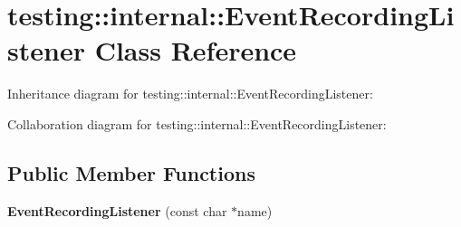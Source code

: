 \hypertarget{classtesting_1_1internal_1_1EventRecordingListener}{}\section{testing\+:\+:internal\+:\+:Event\+Recording\+Listener Class Reference}
\label{classtesting_1_1internal_1_1EventRecordingListener}


Inheritance diagram for testing\+:\+:internal\+:\+:Event\+Recording\+Listener\+:


Collaboration diagram for testing\+:\+:internal\+:\+:Event\+Recording\+Listener\+:
\subsection*{Public Member Functions}
\begin{DoxyCompactItemize}
\item 
\mbox{\label{classtesting_1_1internal_1_1EventRecordingListener_a7b0254c15d6b8468e1441ee572fee707}} 
{\bfseries Event\+Recording\+Listener} (const char $\ast$name)
\end{DoxyCompactItemize}
